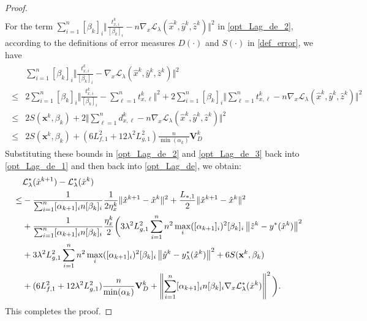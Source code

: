 \documentclass{article}
\theoremstyle{plain}
\theoremstyle{definition}
\theoremstyle{remark}
\begin{document}
\begin{proof}
\begin{align}
	\end{align}
	For the term $\sum_{i=1}^n[\beta_{k}]_i\bigg\Vert\frac{t_{x,i}^k}{[\beta_{k}]_i}-n\nabla_{x}\mathcal{L}_{\lambda}(\hat{x}^{k}, \hat{y}^{k}, \hat{z}^{k})\bigg\Vert^2$ in \eqref{opt_Lag_de_2}, according to the definitions of error measures $D(\cdot)$ and $S(\cdot)$ in \eqref{def_error}, we have
	\begin{align}\label{opt_Lag_de_3}
    \begin{aligned}
		&\sum_{i=1}^n[\beta_{k}]_i\bigg\Vert\frac{t_{x,i}^k}{[\beta_{k}]_i}-\nabla_{x}\mathcal{L}_{\lambda}(\hat{x}^{k}, \hat{y}^{k}, \hat{z}^{k})\bigg\Vert^2 \\
		\leq
		&2\sum_{i=1}^{n}[\beta_{k}]_{i}\bigg\Vert\frac{t_{x,i}^{k}}{[\beta_{k}]_{i}}-\sum_{\ell=1}^{n}t_{x,\ell}^{k}\bigg\Vert^{2}+2\sum_{i=1}^{n}[\beta_{k}]_{i}\bigg\Vert\sum_{\ell=1}^{n}t_{x,\ell}^{k}-n\nabla_{x}\mathcal{L}_{\lambda}(\hat{x}^{k}, \hat{y}^{k}, \hat{z}^{k})\bigg\Vert^{2}  \\
		\leq
		&2S(\mathbf{x}^{k},\beta_{k})+2\bigg\Vert\sum_{\ell=1}^{n}d_{x,\ell}^{k}-n\nabla_{x}\mathcal{L}_{\lambda}(\hat{x}^{k}, \hat{y}^{k}, \hat{z}^{k})\bigg\Vert^{2}  \\	
		\leq
		& 2S(\mathbf{x}^{k},\beta_{k})+(6L_{f,1}^{2}+12\lambda^{2} L_{g,1}^{2})\frac{n}{\min(\alpha_{k})}\mathbf{V}_{D}^{k} 
            \end{aligned}
	\end{align}
Substituting these bounds in  \eqref{opt_Lag_de_2} and   \eqref{opt_Lag_de_3} back  into \eqref{opt_Lag_de_1} and then back into \eqref{opt_Lag_de}, we obtain:
\begin{align*}
			&\mathcal{L}_{\lambda}^{*}(\hat{x}^{k+1})- \mathcal{L}_{\lambda}^{*}(\hat{x}^{k})\\
			\leq 
			&-\frac{1}{\sum_{i=1}^{n}[\alpha_{k+1}]_{i} n[\beta_{k}]_{i}}\frac{1}{2\eta_x^{k}}\|\hat{x}^{k+1}-\hat{x}^{k}\|^{2}
			+\frac{L_{*,1}}{2}\|\hat{x}^{k+1}-\hat{x}^{k}\|^{2}\\
            &+\frac{1}{\sum_{i=1}^{n}[\alpha_{k+1}]_{i} n[\beta_{k}]_{i}}\frac{\eta_x^{k}}{2}\bigg(3\lambda^{2}L_{g,1}^{2}\sum_{i=1}^{n}n^2\max_{i}([\alpha_{k+1}]_{i})^{2}[\beta_{k}]_{i}\left\|\hat{z}^{k}-y^*(\hat{x}^{k})\right\|^{2}\\
            &+3\lambda^{2}L_{g,1}^{2}\sum_{i=1}^{n}n^2\max_{i}([\alpha_{k+1}]_{i})^{2}[\beta_{k}]_{i}\left\|\hat{y}^{k}-y_{\lambda}^*(\hat{x}^{k})\right\|^{2} +6S(\mathbf{x}^{k},\beta_{k})\notag \\
		&+(6L_{f,1}^{2}+12\lambda^{2} L_{g,1}^{2})\frac{n}{\min(\alpha_{k})}\mathbf{V}_{D}^{k}+\left\|\sum_{i=1}^{n}[\alpha_{k+1}]_{i} n[\beta_{k}]_{i}\nabla_{x}\mathcal{L}_{\lambda}^{*}(\hat{x}^{k}) \right\|^{2}\bigg).
		\end{align*}
        This completes the proof.
\end{proof}
\end{document}
